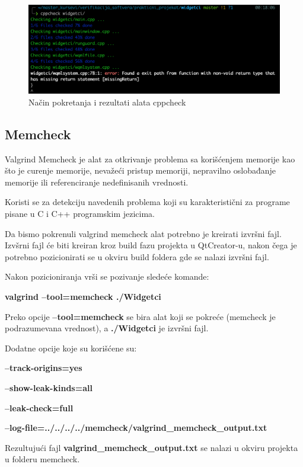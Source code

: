 \documentclass[a4paper]{article}
\begin{document}
\begin{figure}[h!]
\begin{center}
\includegraphics[scale=0.45]{cppcheck-00.png}
\end{center}
\caption{Način pokretanja i rezultati alata cppcheck}
\label{fig: cppcheck-0}
\end{figure}

\subsection{Memcheck}

Valgrind Memcheck je alat za otkrivanje problema sa korišćenjem memorije kao što je curenje memorije, nevažeći pristup memoriji, nepravilno oslobađanje memorije ili referenciranje nedefinisanih vrednosti.

Koristi se za detekciju navedenih problema koji su karakteristični za programe pisane u C i C++ programskim jezicima.

Da bismo pokrenuli valgrind memcheck alat potrebno je kreirati izvršni fajl. Izvšrni fajl će biti kreiran kroz build fazu projekta u QtCreator-u, nakon čega je potrebno pozicionirati se u okviru build foldera gde se nalazi izvršni fajl.

Nakon pozicioniranja vrši se pozivanje sledeće komande:

\textbf{valgrind --tool=memcheck ./Widgetci}

Preko opcije \textbf{--tool=memcheck} se bira alat koji se pokreće (memcheck je podrazumevana vrednost), a \textbf{./Widgetci} je izvršni fajl.

Dodatne opcije koje su korišćene su:

\textbf{--track-origins=yes}

\textbf{--show-leak-kinds=all}

\textbf{--leak-check=full}

\textbf{--log-file=../../../../memcheck/valgrind\_memcheck\_output.txt}

Rezultujući fajl \textbf{valgrind\_memcheck\_output.txt} se nalazi u okviru projekta u folderu memcheck.
\end{document}

